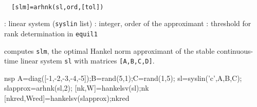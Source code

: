 \begin{mandesc}
   \\ %
\end{mandesc}
\begin{calling_sequence}
\begin{verbatim}
  [slm]=arhnk(sl,ord,[tol])     
\end{verbatim}
\end{calling_sequence}
\begin{parameters}
  \begin{varlist}
    : linear system (\verb!syslin! list)
    : integer, order of the approximant
    : threshold for rank determination in \verb!equil1!
  \end{varlist}
\end{parameters}
\begin{mandescription}
  computes \verb!slm!, the optimal Hankel norm approximant of the stable
  continuous-time linear system \verb!sl! with matrices \verb![A,B,C,D]!.
\end{mandescription}
\begin{examples}
  \begin{mintednsp}{nsp}
    A=diag([-1,-2,-3,-4,-5]);B=rand(5,1);C=rand(1,5);
    sl=syslin('c',A,B,C);
    slapprox=arhnk(sl,2);
    [nk,W]=hankelsv(sl);nk
    [nkred,Wred]=hankelsv(slapprox);nkred
  \end{mintednsp}
\end{examples}
\begin{manseealso}
      
\end{manseealso}
